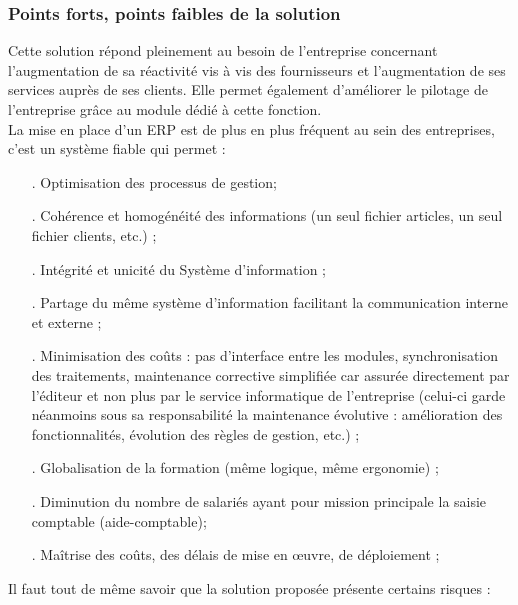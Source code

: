 \subsubsection{Points forts, points faibles de la solution}
Cette solution répond pleinement au besoin de l'entreprise concernant l'augmentation de sa réactivité vis à vis des fournisseurs et l'augmentation de ses services auprès de ses clients. Elle permet également d'améliorer le pilotage de l'entreprise grâce au module dédié à cette fonction.\\
La mise en place d'un ERP est de plus en plus fréquent au sein des entreprises, c'est un système fiable qui permet : 
\begin{itemize}
\item[.]Optimisation des processus de gestion;
\item[.]Cohérence et homogénéité des informations (un seul fichier articles, un seul fichier clients, etc.) ;
\item[.]Intégrité et unicité du Système d'information ;
\item[.]Partage du même système d’information facilitant la communication interne et externe ;
\item[.]Minimisation des coûts : pas d’interface entre les modules, synchronisation des traitements, maintenance corrective simplifiée car assurée directement par l'éditeur et non plus par le service informatique de l'entreprise (celui-ci garde néanmoins sous sa responsabilité la maintenance évolutive : amélioration des fonctionnalités, évolution des règles de gestion, etc.) ;
\item[.]Globalisation de la formation (même logique, même ergonomie) ;
\item[.]Diminution du nombre de salariés ayant pour mission principale la saisie comptable (aide-comptable);
\item[.]Maîtrise des coûts, des délais de mise en œuvre, de déploiement ;\\
\end{itemize}

Il faut tout de même savoir que la solution proposée présente certains risques : 

